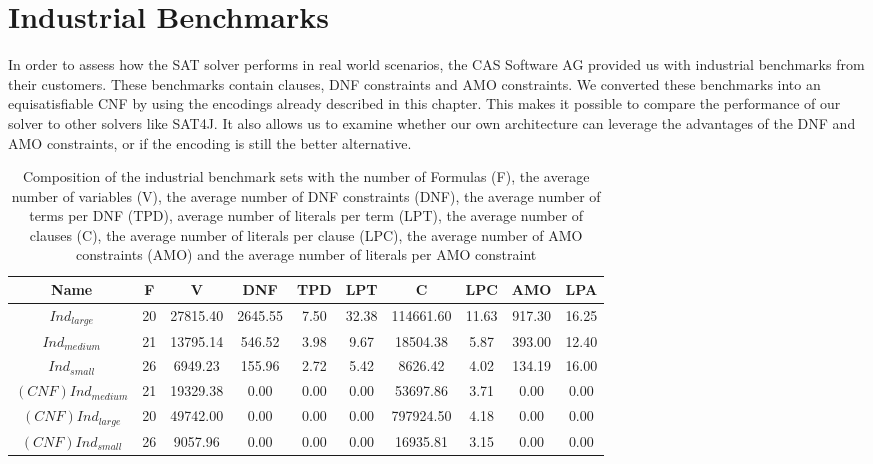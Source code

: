 \section{Industrial Benchmarks}

In order to assess how the SAT solver performs in real world scenarios, the CAS Software AG provided us with industrial benchmarks from their customers. These benchmarks contain clauses, DNF constraints and AMO constraints. We converted these benchmarks into an equisatisfiable CNF by using the encodings already described in this chapter. This makes it possible to compare the performance of our solver to other solvers like SAT4J. It also allows us to examine whether our own architecture can leverage the advantages of the DNF and AMO constraints, or if the encoding is still the better alternative.

\begin{table}[!htb]
\centering
\caption[Composition of the industrial benchmark sets]{Composition of the industrial benchmark sets with the number of Formulas (F), the average number of variables (V), the average number of DNF constraints (DNF), the average number of terms per DNF (TPD), average number of literals per term (LPT), the average number of clauses (C), the average number of literals per clause (LPC), the average number of AMO constraints (AMO) and the average number of literals per AMO constraint}
\label{tab:industrialBenchmarks}
\begin{tabular}{|c|c|c|c|c|c|c|c|c|c|}
\hline
Name & F & V & DNF & TPD & LPT & C & LPC & AMO & LPA \\ 
\hline
$Ind_{large}$ & 20 & 27815.40 & 2645.55 & 7.50 & 32.38 & 114661.60 & 11.63 & 917.30 & 16.25 \\ 
 \hline 
$Ind_{medium}$ & 21 & 13795.14 & 546.52 & 3.98 & 9.67 & 18504.38 & 5.87 & 393.00 & 12.40 \\ 
 \hline 
$Ind_{small}$ & 26 & 6949.23 & 155.96 & 2.72 & 5.42 & 8626.42 & 4.02 & 134.19 & 16.00 \\ 
 \hline 
$(CNF)Ind_{medium}$& 21 & 19329.38 & 0.00 & 0.00 & 0.00 & 53697.86 & 3.71 & 0.00 & 0.00 \\ 
 \hline 
$(CNF)Ind_{large}$ & 20 & 49742.00 & 0.00 & 0.00 & 0.00 & 797924.50 & 4.18 & 0.00 & 0.00 \\ 
 \hline 
$(CNF)Ind_{small}$ & 26 & 9057.96 & 0.00 & 0.00 & 0.00 & 16935.81 & 3.15 & 0.00 & 0.00 \\ 
 \hline 
\end{tabular}
\end{table}

